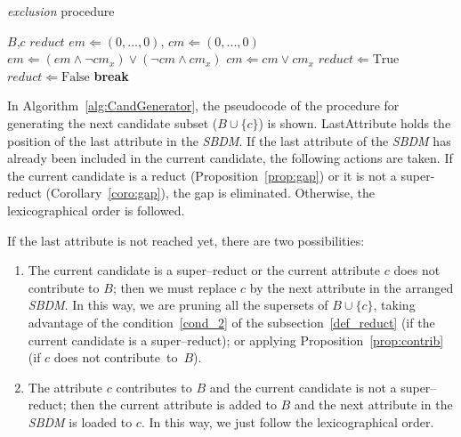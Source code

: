 \documentclass[number,preprint,review,12pt]{elsarticle}
\begin{document}
	\begin{algorithm}
	\footnotesize
	\caption{\textit{exclusion} procedure}
	\label{alg:exclusion}
	\begin{algorithmic}[1]
		\Require $B$,$c$
		\Ensure $reduct$
		\State $em \Leftarrow (0,...,0)$, $cm \Leftarrow (0,...,0)$
		 \label{line:em} 
			\State $em \Leftarrow (em\wedge \neg 
					cm_x) \vee (\neg cm \wedge cm_x)$
			\State $cm \Leftarrow cm \vee cm_x$\label{line:emEnd}
		\EndFor
		\State $reduct \Leftarrow \mathrm{True}$\label{line:reduct}
		  
				\State $reduct \Leftarrow \mathrm{False}$
				\State \textbf{break}\label{line:reductEnd}
			\EndIf
		\EndFor
	\end{algorithmic}
	\end{algorithm}
	
	In Algorithm~\ref{alg:CandGenerator}, the pseudocode of the procedure for generating the next candidate subset ($B\cup \lbrace c\rbrace$) is shown. LastAttribute holds the position of the last attribute in the \textit{SBDM}. If the last attribute of the \textit{SBDM} has already been included in the current candidate, the following actions are taken. If the current candidate is a reduct (Proposition~\ref{prop:gap}) or it is not a super-reduct (Corollary~\ref{coro:gap}), the gap is eliminated.	Otherwise, the lexicographical order is followed. 
	
	If the last attribute is not reached yet, there are two possibilities:			
	\begin{enumerate}
		\item The current candidate is a super--reduct or the current attribute $c$ does not contribute to $B$; then we must replace $c$ by the next attribute in the arranged \textit{SBDM}. In this way, we are pruning all the supersets of $B\cup\lbrace c\rbrace$, taking advantage of the condition~\ref{cond_2} of the subsection~\ref{def_reduct} (if the current candidate is a super--reduct); or applying Proposition~\ref{prop:contrib} (if $c$ does not contribute~to~$B$).
		
		\item The attribute $c$ contributes to $B$ and the current candidate is not a super--reduct; then the current attribute is added to $B$ and the next attribute in the \textit{SBDM} is loaded to $c$. In this way, we just follow the lexicographical order.
	\end{enumerate}  	
			
\end{document}
